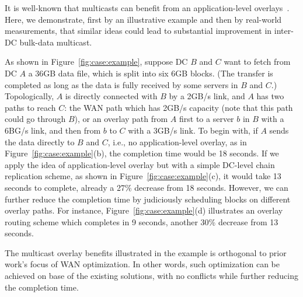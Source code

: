 It is well-known that multicasts can benefit from an
application-level overlays~\cite{chu2000case}.
Here, we demonstrate, first by an illustrative example and then by
real-world measurements, that similar ideas could lead to
substantial improvement in inter-DC bulk-data multicast.

As shown in Figure~\ref{fig:case:example},
suppose DC $B$ and $C$ want to fetch from DC $A$ a 36GB data file,
which is split into six 6GB blocks.
(The transfer is completed as long as the data is fully received
by some servers in $B$ and $C$.)
Topologically, $A$ is directly connected with $B$ by a 2GB/s
link, and $A$ has two paths to reach $C$: the WAN path
which has 2GB/s capacity
(note that this path could go through $B$), or an overlay path
from $A$ first to a server $b$ in $B$ with a 6BG/s link,
and then from $b$ to $C$ with a 3GB/s link.
To begin with, if $A$ sends the data directly to $B$ and $C$,
i.e., no application-level overlay,
as in Figure~\ref{fig:case:example}(b),
the completion time would be 18 seconds.
If we apply the idea of application-level overlay but with
a simple DC-level chain
replication scheme, as shown in Figure~\ref{fig:case:example}(c),
it would take 13 seconds
to complete, already a 27\% decrease from 18 seconds.
However, we can further reduce the completion time
by judiciously scheduling blocks on different
overlay paths. For instance, Figure~\ref{fig:case:example}(d)
illustrates an overlay routing scheme which completes in 9
seconds, another 30\% decrease from 13 seconds.

The multicast overlay benefits illustrated in the example is orthogonal to prior work's focus of WAN optimization. In other words, such optimization can be achieved on base of the existing solutions, with no conflicts while further reducing the completion time.




